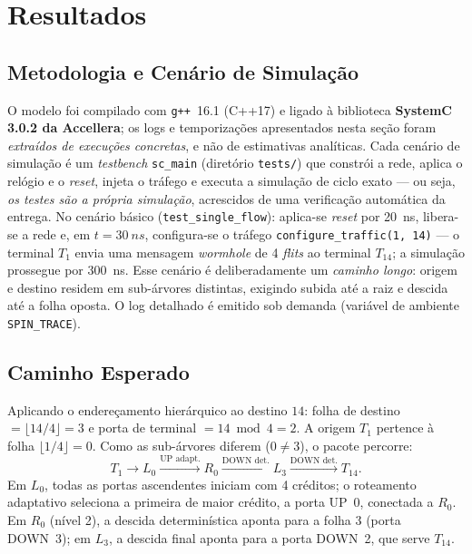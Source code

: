 \documentclass[conference]{IEEEtran}
\begin{document}
\section{Resultados}
\label{sec:resultados}

\subsection{Metodologia e Cenário de Simulação}
O modelo foi compilado com \texttt{g++}~16.1 (C++17) e ligado à biblioteca
\textbf{SystemC 3.0.2 da Accellera}; os logs e temporizações apresentados nesta
seção foram \emph{extraídos de execuções concretas}, e não de estimativas
analíticas. Cada cenário de simulação é um \emph{testbench} \texttt{sc\_main}
(diretório \texttt{tests/}) que constrói a rede, aplica o relógio e o
\emph{reset}, injeta o tráfego e executa a simulação de ciclo exato --- ou seja,
\emph{os testes são a própria simulação}, acrescidos de uma verificação
automática da entrega. No cenário básico (\texttt{test\_single\_flow}):
aplica-se \emph{reset} por \SI{20}{ns}, libera-se a rede e, em $t=\SI{30}{ns}$,
configura-se o tráfego \texttt{configure\_traffic(1, 14)} --- o terminal $T_1$
envia uma mensagem \emph{wormhole} de 4 \emph{flits} ao terminal $T_{14}$; a
simulação prossegue por \SI{300}{ns}. Esse cenário é deliberadamente um
\emph{caminho longo}: origem e destino residem em sub-árvores distintas,
exigindo subida até a raiz e descida até a folha oposta. O log detalhado é
emitido sob demanda (variável de ambiente \texttt{SPIN\_TRACE}).

\subsection{Caminho Esperado}
Aplicando o endereçamento hierárquico ao destino $14$: folha de destino
$=\lfloor 14/4\rfloor = 3$ e porta de terminal $=14 \bmod 4 = 2$. A origem $T_1$
pertence à folha $\lfloor 1/4 \rfloor = 0$. Como as sub-árvores diferem
($0 \neq 3$), o pacote percorre:
\begin{equation}
T_1 \rightarrow L_0 \xrightarrow{\text{UP adapt.}} R_0
\xrightarrow{\text{DOWN det.}} L_3 \xrightarrow{\text{DOWN det.}} T_{14}.
\nonumber
\end{equation}
Em $L_0$, todas as portas ascendentes iniciam com 4 créditos; o roteamento
adaptativo seleciona a primeira de maior crédito, a porta UP~0, conectada a
$R_0$. Em $R_0$ (nível 2), a descida determinística aponta para a folha 3
(porta DOWN~3); em $L_3$, a descida final aponta para a porta DOWN~2, que serve
$T_{14}$.
\end{document}
